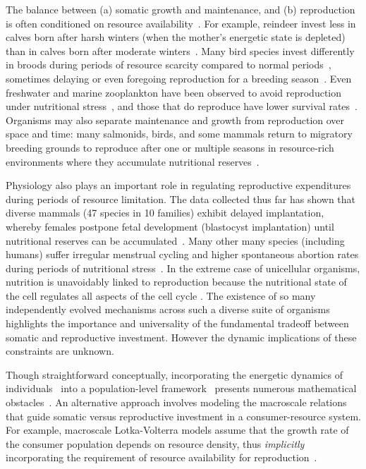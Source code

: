 \documentclass{pnastwo}
\begin{document}
\begin{article}
The balance between (a) somatic growth and maintenance, and (b) reproduction
is often conditioned on resource availability~\cite{Morris:1987eo}.  For
example, reindeer invest less in calves born after harsh winters (when the
mother's energetic state is depleted) than in calves born after moderate
winters~\cite{Tveraa:2003fq}.  Many bird species invest differently in broods
during periods of resource scarcity compared to normal
periods~\cite{Daan:1988va,Jacot:2009dv}, sometimes delaying or even foregoing
reproduction for a breeding
season~\cite{Martin:1987dl,Stearns:1989ip,Barboza:2002in}.  Even freshwater
and marine zooplankton have been observed to avoid reproduction under
nutritional stress~\cite{Threlkeld:1976ih}, and those that do reproduce have
lower survival rates~\cite{Kirk:1997cc}. Organisms may also separate
maintenance and growth from reproduction over space and time: many salmonids,
birds, and some mammals return to migratory breeding grounds to reproduce
after one or multiple seasons in resource-rich environments where they
accumulate nutritional
reserves~\cite{Weber:1998jg,Mduma:1999cp,Moore:2014hi}.

Physiology also plays an important role in regulating reproductive
expenditures during periods of resource limitation.  The data collected thus
far has shown that diverse mammals (47 species in 10 families) exhibit
delayed implantation, whereby females postpone fetal development (blastocyst
implantation) until nutritional reserves can be
accumulated~\cite{Mead:1989dt,Sandell:1990kw}.  Many other many species
(including humans) suffer irregular menstrual cycling and higher spontaneous
abortion rates during periods of nutritional
stress~\cite{Bulik:1999eo,Trites:2003cc}.  In the extreme case of unicellular
organisms, nutrition is unavoidably linked to reproduction because the
nutritional state of the cell regulates all aspects of the cell cycle
\cite{Glazier:2009hq}.  The existence of so many independently evolved
mechanisms across such a diverse suite of organisms highlights the importance
and universality of the fundamental tradeoff between somatic and reproductive
investment.  However the dynamic implications of these constraints are
unknown.

Though straightforward conceptually, incorporating the energetic dynamics of
individuals~\cite{Kooi2000} into a population-level
framework~\cite{Kooi2000,Sousa:2010ez} presents numerous mathematical
obstacles~\cite{Diekmann:2010da}.  An alternative approach involves modeling
the macroscale relations that guide somatic versus reproductive investment in
a consumer-resource system.  For example, macroscale Lotka-Volterra models
assume that the growth rate of the consumer population depends on resource
density, thus \emph{implicitly} incorporating the requirement of resource
availability for reproduction~\cite{murdoch:2003}.


\end{article}
\end{document}

